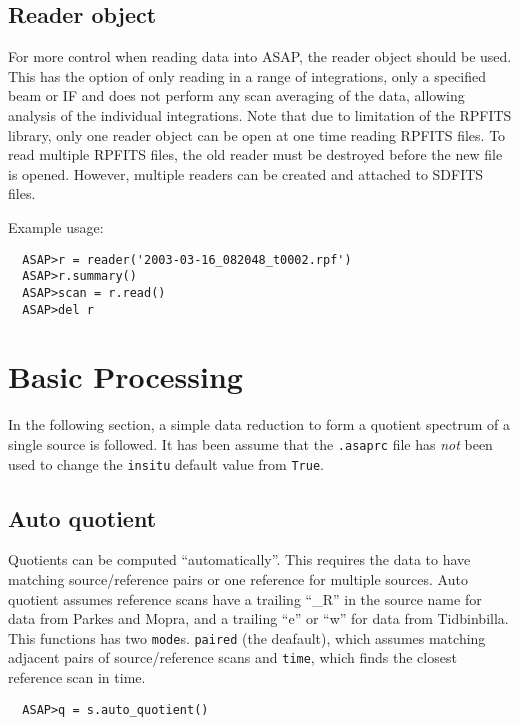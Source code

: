 \documentclass[11pt]{article}
\newcommand{\cmd}[1]{{\tt #1}}
\begin{document}
\subsection{Reader object}

For more control
when reading data into ASAP, the reader object should be used.  This
has the option of only reading in a range of integrations, only a
specified beam or IF and does not perform any scan averaging of the
data, allowing analysis of the individual integrations.  Note that due
to limitation of the RPFITS library, only one reader object can be
open at one time reading RPFITS files.  To read multiple RPFITS files,
the old reader must be destroyed before the new file is opened.
However, multiple readers can be created and attached to SDFITS files.


Example usage:

\begin{verbatim}
  ASAP>r = reader('2003-03-16_082048_t0002.rpf')
  ASAP>r.summary()
  ASAP>scan = r.read()
  ASAP>del r
\end{verbatim}

\section{Basic Processing}

In the following section, a simple data reduction to form a quotient
spectrum of a single source is followed.  It has been assume that the
\cmd{.asaprc} file has {\em not} been used to change the \cmd{insitu}
default value from \cmd{True}.

\subsection{Auto quotient}
Quotients can be computed ``automatically''. This
requires the data to have matching source/reference pairs or one
reference for multiple sources. Auto quotient assumes reference scans
have a trailing ``\_R'' in the source name for data from Parkes and
Mopra, and a trailing ``e'' or ``w'' for data from Tidbinbilla.
This functions has two \cmd{mode}s. \cmd{paired} (the deafault), which assumes
matching adjacent pairs of source/reference scans and \cmd{time}, which finds
the closest reference scan in time.

\begin{verbatim}
  ASAP>q = s.auto_quotient()
\end{verbatim}
\end{document}
